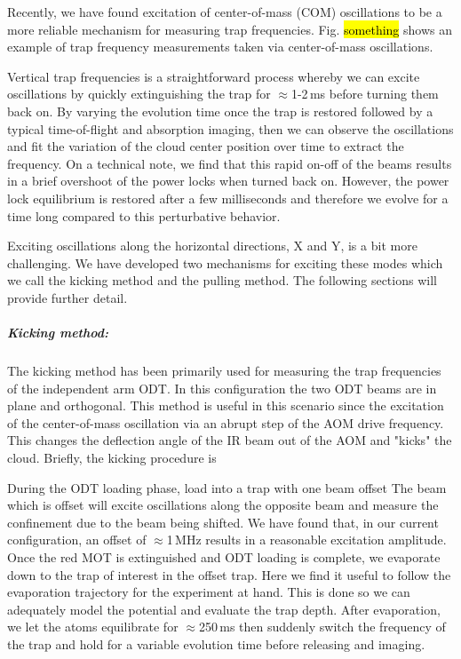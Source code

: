 Recently, we have found excitation of center-of-mass (COM) oscillations to be a more reliable mechanism for measuring trap frequencies.
Fig. \hl{something} shows an example of trap frequency measurements taken via center-of-mass oscillations.

Vertical trap frequencies is a straightforward process whereby we can excite oscillations by quickly extinguishing the trap for $\approx$1-2\,ms before turning them back on.
By varying the evolution time once the trap is restored followed by a typical time-of-flight and absorption imaging, then we can observe the oscillations and fit the variation of the cloud center position over time to extract the frequency.
On a technical note, we find that this rapid on-off of the beams results in a brief overshoot of the power locks when turned back on.
However, the power lock equilibrium is restored after a few milliseconds and therefore we evolve for a time long compared to this perturbative behavior.

Exciting oscillations along the horizontal directions, X and Y, is a bit more challenging.
We have developed two mechanisms for exciting these modes which we call the kicking method and the pulling method.
The following sections will provide further detail.

\subparagraph{Kicking method:}
The kicking method has been primarily used for measuring the trap frequencies of the independent arm ODT.
In this configuration the two ODT beams are in plane and orthogonal.
This method is useful in this scenario since the excitation of the center-of-mass oscillation via an abrupt step of the AOM drive frequency.
This changes the deflection angle of the IR beam out of the AOM and "kicks" the cloud.
Briefly, the kicking procedure is 
\begin{outline}[enumerate]
	\1 During the ODT loading phase, load into a trap with one beam offset
		\2 The beam which is offset will excite oscillations along the opposite beam and measure the confinement due to the beam being shifted.
		\2 We have found that, in our current configuration, an offset of $\approx$1\,MHz results in a reasonable excitation amplitude.
	\1 Once the red MOT is extinguished and ODT loading is complete, we evaporate down to the trap of interest in the offset trap.
		\2 Here we find it useful to follow the evaporation trajectory for the experiment at hand. This is done so we can adequately model the potential and evaluate the trap depth.
	\1 After evaporation, we let the atoms equilibrate for $\approx$250\,ms then suddenly switch the frequency of the trap and hold for a variable evolution time before releasing and imaging.
\end{outline}

